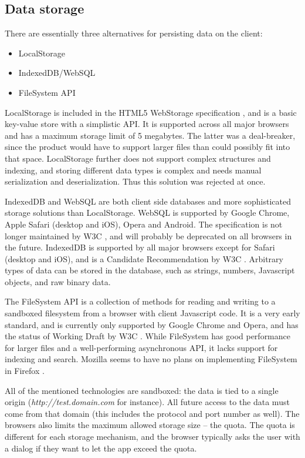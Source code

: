 \subsection{Data storage}

There are essentially three alternatives for persisting data on the client:

\begin{itemize}
\item LocalStorage
\item IndexedDB/WebSQL
\item FileSystem API
\end{itemize}

LocalStorage is included in the HTML5 WebStorage specification \cite{WebStorage:Online}, and is a basic key-value store with a simplistic API. It is supported across all major browsers and has a maximum storage limit of 5 megabytes. The latter was a deal-breaker, since the product would have to support larger files than could possibly fit into that space. LocalStorage further does not support complex structures and indexing, and storing different data types is complex and needs manual serialization and deserialization. Thus this solution was rejected at once.

IndexedDB and WebSQL are both client side databases and more sophisticated storage solutions than LocalStorage. WebSQL is supported by Google Chrome, Apple Safari (desktop and iOS), Opera and Android. The specification is not longer maintained by W3C \cite{WebSQL:Online}, and will probably be deprecated on all browsers in the future. IndexedDB is supported by all major browsers except for Safari (desktop and iOS), and is a Candidate Recommendation by W3C \cite{IndexedDB:Online}. Arbitrary types of data can be stored in the database, such as strings, numbers, Javascript objects, and raw binary data.

The FileSystem API is a collection of methods for reading and writing to a sandboxed filesystem from a browser with client Javascript code. It is a very early standard, and is currently only supported by Google Chrome and Opera, and has the status of Working Draft by W3C \cite{FileSystem:Online}. While FileSystem has good performance for larger files and a well-performing asynchronous API, it lacks support for indexing and search. Mozilla seems to have no plans on implementing FileSystem in Firefox \cite{MozillaFileSystem:Online}.

All of the mentioned technologies are sandboxed: the data is tied to a single origin (\emph{http://test.domain.com} for instance). All future access to the data must come from that domain (this includes the protocol and port number as well). The browsers also limits the maximum allowed storage size – the quota. The quota is different for each storage mechanism, and the browser typically asks the user with a dialog if they want to let the app exceed the quota.

